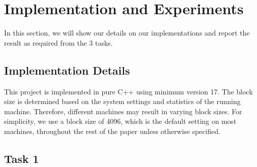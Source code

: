\section{Implementation and Experiments}
\label{sec:exp}

In this section, we will show our details on our implementations and report the result as required from the 3 tasks.

\subsection{Implementation Details}
\label{subsec:implement}

This project is implemented in pure C++ using minimum version 17. The block size is determined based on the system settings and statistics of the running machine. Therefore, different machines may result in varying block sizes. For simplicity, we use a block size of 4096, which is the default setting on most machines, throughout the rest of the paper unless otherwise specified.

\subsection{Task 1}
\label{subsec:task1}


